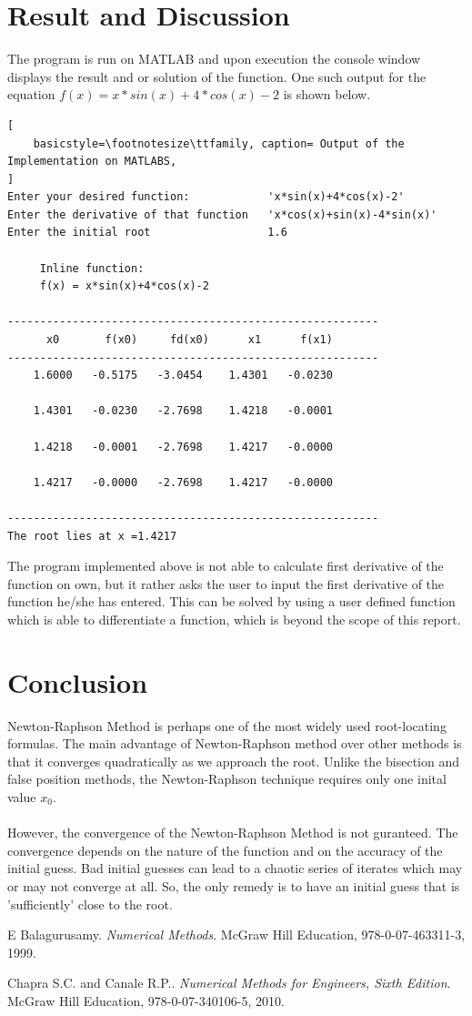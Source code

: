 \documentclass[12pt, a4paper, titlepage]{article}
\begin{document}
\section{Result and Discussion}
The program is run on MATLAB and upon execution the console window displays the result and or solution of the function. One such output for the equation $f(x) = x* sin(x) + 4*cos(x) - 2$ is shown below.\\
\begin{lstlisting}[
    basicstyle=\footnotesize\ttfamily, caption= Output of the Implementation on MATLABS,
]
Enter your desired function:            'x*sin(x)+4*cos(x)-2'
Enter the derivative of that function   'x*cos(x)+sin(x)-4*sin(x)'
Enter the initial root                  1.6

     Inline function:
     f(x) = x*sin(x)+4*cos(x)-2

---------------------------------------------------------
      x0       f(x0)     fd(x0)      x1      f(x1)       
---------------------------------------------------------
    1.6000   -0.5175   -3.0454    1.4301   -0.0230

    1.4301   -0.0230   -2.7698    1.4218   -0.0001

    1.4218   -0.0001   -2.7698    1.4217   -0.0000

    1.4217   -0.0000   -2.7698    1.4217   -0.0000

---------------------------------------------------------
The root lies at x =1.4217
\end{lstlisting}
The program implemented above is not able to calculate first derivative of the function on own, but it rather asks the user to input the first derivative of the function he/she has entered. This can be solved by using a user defined function which is able to differentiate a function, which is beyond the scope of this report. 

\section{Conclusion}
Newton-Raphson Method is perhaps one of the most widely used root-locating formulas. The main advantage of Newton-Raphson method over other methods is that it converges quadratically as we approach the root. Unlike the bisection and false position methods, the Newton-Raphson technique requires only one inital value $x_0$.  \\ \\
However, the convergence of the Newton-Raphson Method is not guranteed. The convergence depends on the nature of the function and on the accuracy of the initial guess. Bad initial guesses can lead to a chaotic series of iterates which may or may not converge at all. So, the only remedy is to have an initial guess that is 'sufficiently' close to the root. 
\begin{thebibliography}{9}
 
E Balagurusamy. 
\textit{Numerical Methods}. 
McGraw Hill Education, 978-0-07-463311-3, 1999.
 
Chapra S.C. and Canale R.P.. 
\textit{Numerical Methods for Engineers, Sixth Edition}. 
McGraw Hill Education, 978-0-07-340106-5, 2010.
\end{thebibliography}
\end{document}
